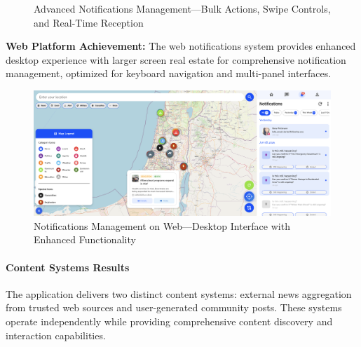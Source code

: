 \begin{figure}[!htbp]
{    }%
    \caption{Advanced Notifications Management---Bulk Actions, Swipe Controls, and Real-Time Reception}\label{fig:android_notifications_advanced}
\end{figure}

\textbf{Web Platform Achievement:}
The web notifications system provides enhanced desktop experience with larger screen real estate for comprehensive notification management, optimized for keyboard navigation and multi-panel interfaces.

\begin{figure}[!htbp]
    \centering
    \includegraphics[width=1\textwidth]{figures/ui/notifcations_page_web.png}
    \caption{Notifications Management on Web---Desktop Interface with Enhanced Functionality}\label{fig:web_notifications}
\end{figure}

\paragraph{Content Systems Results}
The application delivers two distinct content systems: external news aggregation from trusted web sources and user-generated community posts. These systems operate independently while providing comprehensive content discovery and interaction capabilities.


